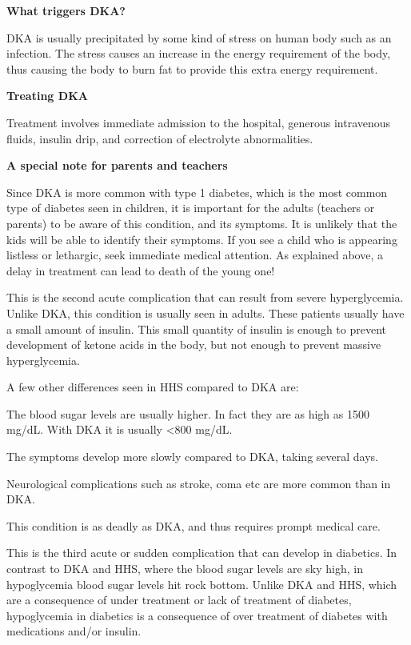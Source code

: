 \textbf{What triggers DKA?}

DKA is usually precipitated by some kind of stress on human body such as an infection. The stress causes an increase in the energy requirement of the body, thus causing the body to burn fat to provide this extra energy requirement.

\textbf{Treating DKA}

Treatment involves immediate admission to the hospital, generous intravenous fluids, insulin drip, and correction of electrolyte abnormalities.

\textbf{A special note for parents and teachers}

Since DKA is more common with type 1 diabetes, which is the most common type of diabetes seen in children, it is important for the adults (teachers or parents) to be aware of this condition, and its symptoms. It is unlikely that the kids will be able to identify their symptoms. If you see a child who is appearing listless or lethargic, seek immediate medical attention. As explained above, a delay in treatment can lead to death of the young one!


This is the second acute complication that can result from severe hyperglycemia. Unlike DKA, this condition is usually seen in adults. These patients usually have a small amount of insulin. This small quantity of insulin is enough to prevent development of ketone acids in the body, but not enough to prevent massive hyperglycemia.

A few other differences seen in HHS compared to DKA are:

\item The blood sugar levels are usually higher. In fact they are as high as 1500 mg/dL. With DKA it is usually \textless 800 mg/dL.

 \item The symptoms develop more slowly compared to DKA, taking several days.

 \item Neurological complications such as stroke, coma etc are more common than in DKA.

This condition is as deadly as DKA, and thus requires prompt medical care.


This is the third acute or sudden complication that can develop in diabetics. In contrast to DKA and HHS, where the blood sugar levels are sky high, in hypoglycemia blood sugar levels hit rock bottom. Unlike DKA and HHS, which are a consequence of under treatment or lack of treatment of diabetes, hypoglycemia in diabetics is a consequence of over treatment of diabetes with medications and/or insulin.

